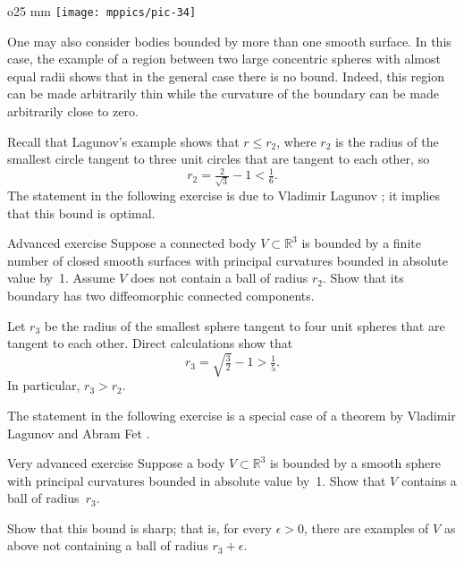 \begin{wrapfigure}{o}{25 mm}
\vskip-0mm
\centering
\texttt{[image: mppics/pic-34]}
\vskip0mm
\end{wrapfigure}

One may also consider bodies bounded by more than one smooth surface.
In this case, the example of a region between two large concentric spheres with almost equal radii shows that in the general case there is no bound.
Indeed, this region can be made arbitrarily thin while the curvature of the boundary can be made arbitrarily close to zero.

Recall that Lagunov's example shows that $r\le r_2$,
where $r_2$ is the radius of the smallest circle tangent to three unit circles that are tangent to each other,
so 
\[r_2=\tfrac2{\sqrt{3}}-1< \tfrac16.\]
The statement in the following exercise is due to Vladimir Lagunov \cite{lagunov-1960};
it implies that this bound is optimal.

\begin{thm}{Advanced exercise}\label{ex:thin}
Suppose a connected body $V\subset \mathbb{R}^3$ is bounded by a finite number of closed smooth surfaces with principal curvatures bounded in absolute value by~1.
Assume $V$ does not contain a ball of radius $r_2$.
Show that its boundary has two diffeomorphic connected components. 
\end{thm}


Let $r_3$
be the radius of the smallest sphere tangent to four unit spheres that are tangent to each other.
Direct calculations show that 
\[r_3=\sqrt{\tfrac32}-1>\tfrac15.\]
In particular, $r_3>r_2$.

The statement in the following exercise is a special case of a theorem by Vladimir Lagunov and Abram Fet \cite{lagunov-fet-1963, lagunov-fet-1965}.

\begin{thm}{Very advanced exercise}\label{ex:PI-sphere}
Suppose a body $V\subset \mathbb{R}^3$ is bounded by a smooth sphere with principal curvatures bounded in absolute value by~1.
Show that $V$ contains a ball of radius~$r_3$.

Show that this bound is sharp; that is, for every $\epsilon >0$, there are examples of $V$ as above not containing a ball of radius $r_3+\epsilon$.
\end{thm}

